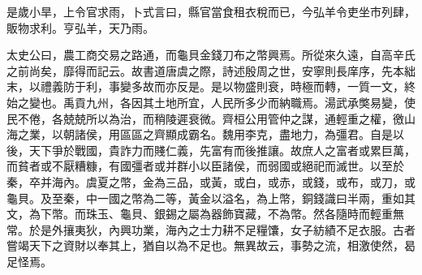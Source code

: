 是歲小旱，上令官求雨，卜式言曰，縣官當食租衣稅而已，今弘羊令吏坐市列肆，販物求利。亨弘羊，天乃雨。

太史公曰，農工商交易之路通，而龜貝金錢刀布之幣興焉。所從來久遠，自高辛氏之前尚矣，靡得而記云。故書道唐虞之際，詩述殷周之世，安寧則長庠序，先本絀末，以禮義防于利，事變多故而亦反是。是以物盛則衰，時極而轉，一質一文，終始之變也。禹貢九州，各因其土地所宜，人民所多少而納職焉。湯武承獘易變，使民不倦，各兢兢所以為治，而稍陵遲衰微。齊桓公用管仲之謀，通輕重之權，徼山海之業，以朝諸侯，用區區之齊顯成霸名。魏用李克，盡地力，為彊君。自是以後，天下爭於戰國，貴詐力而賤仁義，先富有而後推讓。故庶人之富者或累巨萬，而貧者或不厭糟糠，有國彊者或并群小以臣諸侯，而弱國或絕祀而滅世。以至於秦，卒并海內。虞夏之幣，金為三品，或黃，或白，或赤，或錢，或布，或刀，或龜貝。及至秦，中一國之幣為二等，黃金以溢名，為上幣，銅錢識曰半兩，重如其文，為下幣。而珠玉、龜貝、銀錫之屬為器飾寶藏，不為幣。然各隨時而輕重無常。於是外攘夷狄，內興功業，海內之士力耕不足糧馕，女子紡績不足衣服。古者嘗竭天下之資財以奉其上，猶自以為不足也。無異故云，事勢之流，相激使然，曷足怪焉。